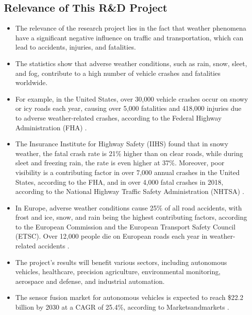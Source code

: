 \documentclass[rnd]{mas_proposal}
\begin{document}
\subsection{Relevance of This R\&D Project}
\begin{itemize}

    \item The relevance of the research project lies in the fact that weather phenomena have a significant negative influence on traffic and transportation, which can lead to accidents, injuries, and fatalities.
    
    \item The statistics show that adverse weather conditions, such as rain, snow, sleet, and fog, contribute to a high number of vehicle crashes and fatalities worldwide.
    
    \item For example, in the United States, over 30,000 vehicle crashes occur on snowy or icy roads each year, causing over 5,000 fatalities and 418,000 injuries due to adverse weather-related crashes, according to the Federal Highway Administration (FHA) \cite{federal-highway-administration-no-date}.
    
    \item The Insurance Institute for Highway Safety (IIHS) found that in snowy weather, the fatal crash rate is 21\% higher than on clear roads, while during sleet and freezing rain, the rate is even higher at 37\%. Moreover, poor visibility is a contributing factor in over 7,000 annual crashes in the United States, according to the FHA, and in over 4,000 fatal crashes in 2018, according to the National Highway Traffic Safety Administration (NHTSA) \cite{brumbelow2022light}.
    
    \item In Europe, adverse weather conditions cause 25\% of all road accidents, with frost and ice, snow, and rain being the highest contributing factors, according to the European Commission and the European Transport Safety Council (ETSC). Over 12,000 people die on European roads each year in weather-related accidents \cite{cookson-2022}.
    
    \item The project's results will benefit various sectors, including autonomous vehicles, healthcare, precision agriculture, environmental monitoring, aerospace and defense, and industrial automation.
    
    \item The sensor fusion market for autonomous vehicles is expected to reach \$22.2 billion by 2030 at a CAGR of 25.4\%, according to Marketsandmarkets \cite{marketsandmarkets}.
    

\end{itemize}
\end{document}
